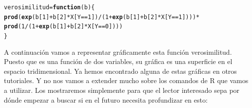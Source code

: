 \documentclass[10pt,a4paper]{article}\usepackage[]{graphicx}\usepackage[]{color}
\makeatletter
\newcommand{\hlnum}[1]{\textcolor[rgb]{0.686,0.059,0.569}{#1}}%
\newcommand{\hlopt}[1]{\textcolor[rgb]{0,0,0}{#1}}%
\newcommand{\hlstd}[1]{\textcolor[rgb]{0.345,0.345,0.345}{#1}}%
\newcommand{\hlkwa}[1]{\textcolor[rgb]{0.161,0.373,0.58}{\textbf{#1}}}%
\newcommand{\hlkwb}[1]{\textcolor[rgb]{0.69,0.353,0.396}{#1}}%
\newcommand{\hlkwc}[1]{\textcolor[rgb]{0.333,0.667,0.333}{#1}}%
\newcommand{\hlkwd}[1]{\textcolor[rgb]{0.737,0.353,0.396}{\textbf{#1}}}%
\newenvironment{kframe}{%
 \def\at@end@of@kframe{}%
 \ifinner\ifhmode%
  \def\at@end@of@kframe{\end{minipage}}%
  \begin{minipage}{\columnwidth}%
 \fi\fi%
 \def\FrameCommand##1{\hskip\@totalleftmargin \hskip-\fboxsep
 \colorbox{shadecolor}{##1}\hskip-\fboxsep
     \hskip-\linewidth \hskip-\@totalleftmargin \hskip\columnwidth}%
 \MakeFramed {\advance\hsize-\width
   \@totalleftmargin\z@ \linewidth\hsize
   \@setminipage}}%
 {\par\unskip\endMakeFramed%
 \at@end@of@kframe}
\newenvironment{knitrout}{}{} %
\newcounter {cont01}
\makeatother
\begin{document}
\begin{knitrout}
\color{fgcolor}\begin{kframe}
\begin{alltt}
\hlstd{verosimilitud} \hlkwb{=} \hlkwa{function}\hlstd{(}\hlkwc{b}\hlstd{)\{}
    \hlkwd{prod}\hlstd{(}\hlkwd{exp}\hlstd{(b[}\hlnum{1}\hlstd{]} \hlopt{+} \hlstd{b[}\hlnum{2}\hlstd{]} \hlopt{*} \hlstd{X[Y}\hlopt{==}\hlnum{1}\hlstd{])} \hlopt{/}\hlstd{(}\hlnum{1} \hlopt{+} \hlkwd{exp}\hlstd{(b[}\hlnum{1}\hlstd{]} \hlopt{+} \hlstd{b[}\hlnum{2}\hlstd{]} \hlopt{*} \hlstd{X[Y}\hlopt{==}\hlnum{1}\hlstd{])))} \hlopt{*}
    \hlkwd{prod}\hlstd{(}\hlnum{1} \hlopt{/}\hlstd{(}\hlnum{1} \hlopt{+} \hlkwd{exp}\hlstd{(b[}\hlnum{1}\hlstd{]} \hlopt{+} \hlstd{b[}\hlnum{2}\hlstd{]} \hlopt{*} \hlstd{X[Y}\hlopt{==}\hlnum{0}\hlstd{])))}
\hlstd{\}}
\end{alltt}
\end{kframe}
\end{knitrout}

A continuación vamos a representar gráficamente esta función verosimilitud. Puesto que es una función de dos variables, su gráfica es una superficie en el espacio tridimensional. Ya hemos encontrado alguna de estas gráficas en otros tutoriales. Y no nos vamos a extender mucho sobre los comandos de R que vamos a utilizar. Los mostraremos simplemente para que el lector interesado sepa por dónde empezar a buscar si en el futuro necesita profundizar en esto:
\end{document}
